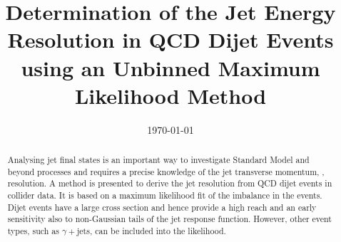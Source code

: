 \documentclass[a4paper]{cmspaper} %
\begin{document}
\begin{titlepage}
  \date{\today}
  \title{Determination of the Jet Energy Resolution in QCD Dijet
    Events using an Unbinned Maximum Likelihood Method}
  \begin{abstract}
    Analysing jet final states is an important way to investigate Standard Model and beyond processes and requires a precise knowledge of the jet transverse momentum, \pt, resolution.	
    A method is presented to derive the jet \pt resolution from QCD dijet events in collider data.
    It is based on a maximum likelihood fit of the \pt imbalance in the events.	
    Dijet events have a large cross section and hence provide a high \pt reach and an early sensitivity also to non-Gaussian tails of the jet response function.
    However, other event types, such as $\gamma+$jets, can be included into the likelihood.	
  \end{abstract}
\end{titlepage}
\tableofcontents












\begin{thebibliography}{9}
\end{thebibliography}
\end{document}
